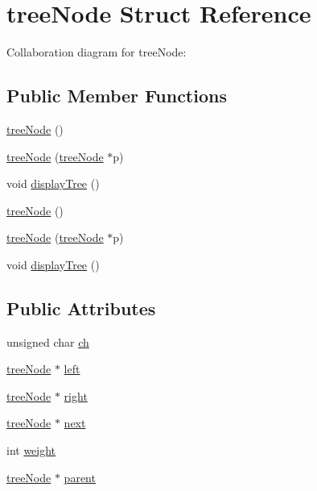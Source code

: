\hypertarget{structtree_node}{\section{tree\-Node \-Struct \-Reference}
\label{structtree_node}
}


\-Collaboration diagram for tree\-Node\-:
\subsection*{\-Public \-Member \-Functions}
\begin{DoxyCompactItemize}
\item 
\hyperlink{structtree_node_aae09fc1a76c1996ff0815c0bfd2b9a03}{tree\-Node} ()
\item 
\hyperlink{structtree_node_a6aa839e46a3a176596b8d70cf5bcfc06}{tree\-Node} (\hyperlink{structtree_node}{tree\-Node} $\ast$p)
\item 
void \hyperlink{structtree_node_aebd3d283b12839a054c28a0184b0fc57}{display\-Tree} ()
\item 
\hyperlink{structtree_node_aae09fc1a76c1996ff0815c0bfd2b9a03}{tree\-Node} ()
\item 
\hyperlink{structtree_node_a6aa839e46a3a176596b8d70cf5bcfc06}{tree\-Node} (\hyperlink{structtree_node}{tree\-Node} $\ast$p)
\item 
void \hyperlink{structtree_node_aebd3d283b12839a054c28a0184b0fc57}{display\-Tree} ()
\end{DoxyCompactItemize}
\subsection*{\-Public \-Attributes}
\begin{DoxyCompactItemize}
\item 
unsigned char \hyperlink{structtree_node_af17cd0f068fbf7bb84907b320b150c72}{ch}
\item 
\hyperlink{structtree_node}{tree\-Node} $\ast$ \hyperlink{structtree_node_a5fd8d599cac4372683e70c3d7d01e9ab}{left}
\item 
\hyperlink{structtree_node}{tree\-Node} $\ast$ \hyperlink{structtree_node_a1739e714a0a9e0d21ef728d4b67e01d3}{right}
\item 
\hyperlink{structtree_node}{tree\-Node} $\ast$ \hyperlink{structtree_node_a8f2a1528b19b54c5725ccc3a4dac7416}{next}
\item 
int \hyperlink{structtree_node_a2c160a93c53987e6342f961ebce33fa4}{weight}
\item 
\hyperlink{structtree_node}{tree\-Node} $\ast$ \hyperlink{structtree_node_a1402205d6cade9ae112ddbb35a96e937}{parent}
\end{DoxyCompactItemize}


